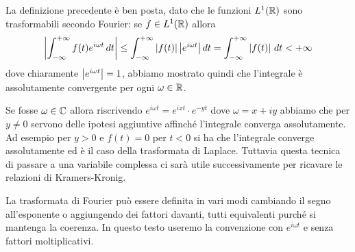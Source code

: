 La definizione precedente è ben posta, dato che le funzioni $ L^1(\mathbb{R}) $ sono trasformabili secondo Fourier: se $ f \in L^1(\mathbb{R}) $ allora
\begin{align} \label{eq: F[f] è limitata}
  \left|{\int_{-\infty}^{+\infty} f(t) e^{i\omega t} \,dt}\right| \leq \int_{-\infty}^{+\infty} \left|{f(t)}\right| {\textstyle \left|{e^{i\omega t}}\right|} \,dt 
  = \int_{-\infty}^{+\infty} \left|{f(t)}\right| \,dt< +\infty
\end{align}
dove chiaramente $ \left|{e^{i\omega t}}\right| = 1 $, abbiamo mostrato quindi che l'integrale è assolutamente convergente per ogni $ \omega \in \mathbb{R} $.
\begin{remark}
  Se fosse $ \omega \in \mathbb{C} $ allora riscrivendo $ e^{i \omega t} = e^{i x t} \cdot e^{-y t} $ dove $ \omega = x + i y $ abbiamo che 
  per $ y \neq 0 $ servono delle ipotesi aggiuntive affinché l'integrale converga assolutamente. Ad esempio per $ y > 0 $ e $ f(t) = 0 $ 
  per $ t < 0 $ si ha che l'integrale converge assolutamente ed è il caso della trasformata di Laplace. Tuttavia questa tecnica di passare a una 
  variabile complessa ci sarà utile successivamente per ricavare le relazioni di Kramers-Kronig.
\end{remark}

La trasformata di Fourier può essere definita in vari modi cambiando il segno all'esponente o aggiungendo dei fattori davanti, tutti equivalenti purché
si mantenga la coerenza. In questo testo useremo la convenzione con $ e^{i\omega t} $ e senza fattori moltiplicativi.


